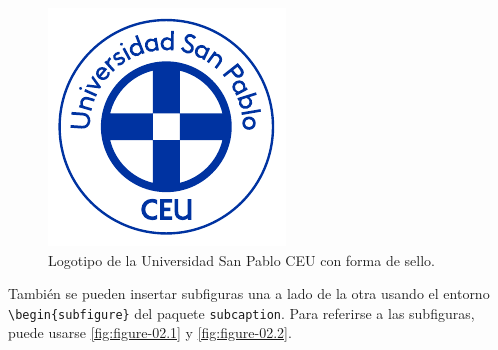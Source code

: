\begin{figure}[!htpb]
    \centering
    \includegraphics[width=0.5\linewidth]{Img/Theme/Logotypes/Sello-usp.pdf}
    \caption[Sello del la USP CEU.]{Logotipo de la Universidad San Pablo CEU con forma de sello.}
    \label{fig:figure-01}
\end{figure}

También se pueden insertar subfiguras una a lado de la otra usando 
el entorno \verb|\begin{subfigure}| del paquete \texttt{subcaption}.
Para referirse a las subfiguras, puede usarse \autoref{fig:figure-02.1} y \autoref{fig:figure-02.2}.

